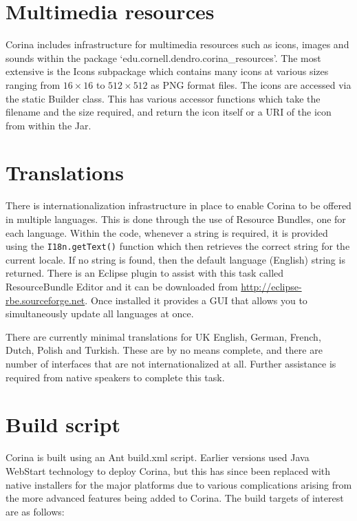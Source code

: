 \section{Multimedia resources}
Corina includes infrastructure for multimedia resources such as icons, images and sounds within the package `edu.cornell.dendro.corina\_resources'.  The most extensive is the Icons subpackage which contains many icons at various sizes ranging from $16\times16$ to $512\times512$ as PNG format files.  The icons are accessed via the static Builder class.  This has various accessor functions which take the filename and the size required, and return the icon itself or a URI of the icon from within the Jar.

\section{Translations}
There is internationalization infrastructure in place to enable Corina to be offered in multiple languages.  This is done through the use of Resource Bundles, one for each language.  Within the code, whenever a string is required, it is provided using the \verb|I18n.getText()| function which then retrieves the correct string for the current locale.  If no string is found, then the default language (English) string is returned.  There is an Eclipse plugin to assist with this task called ResourceBundle Editor and it can be downloaded from \url{http://eclipse-rbe.sourceforge.net}.  Once installed it provides a GUI that allows you to simultaneously update all languages at once.

There are currently minimal translations for UK English, German, French, Dutch, Polish and Turkish.  These are by no means complete, and there are number of interfaces that are not internationalized at all.  Further assistance is required from native speakers to complete this task.

\section{Build script}
\label{txt:buildScript}
Corina is built using an Ant build.xml script.  Earlier versions used Java WebStart technology to deploy Corina, but this has since been replaced with native installers for the major platforms due to various complications arising from the more advanced features being added to Corina.  The build targets of interest are as follows:


